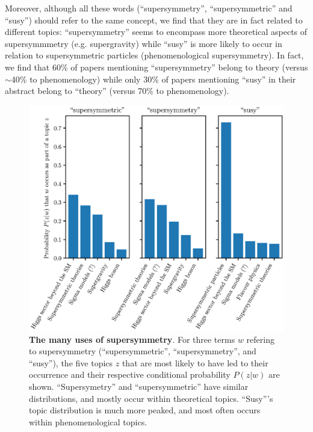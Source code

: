 \documentclass[smallextended]{svjour3}
\begin{document}
Moreover, although all these words (``supersymmetry'', ``supersymmetric'' and ``susy'') should refer to the same concept, we find that they are in fact related to different topics: ``supersymmetry'' seems to encompass more theoretical aspects of supersymmmetry (e.g. supergravity) while ``susy'' is more likely to occur in relation to supersymmetric particles (phenomenological supersymmetry). In fact, we find that 60\% of papers mentioning ``supersymmetry'' belong to theory (versus $\sim$40\% to phenomenology) while only 30\% of papers mentioning ``susy'' in their abstract belong to ``theory'' (versus 70\% to phenomenology).
\begin{figure}
    \centering
    \includegraphics{Fig3.eps}
    \caption{\textbf{The many uses of supersymmetry}. For three terms $w$ refering to supersymmetry (``supersymmetric'', ``supersymmetry'', and ``susy''), the five topics $z$ that are most likely to have led to their occurrence and their respective conditional probability $P(z|w)$ are shown. ``Supersymetry'' and ``supersymmetric'' have similar distributions, and mostly occur within theoretical topics. ``Susy'''s topic distribution is much more peaked, and most often occurs within phenomenological topics.}
    \label{fig:susy_usages}
\end{figure}
\end{document}
